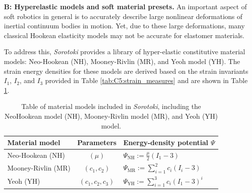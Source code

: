 \textbf{B: Hyperelastic models and soft material presets.} An important aspect of soft robotics in general is to accurately describe large nonlinear deformations of inertial continuum bodies in motion. Yet, due to these large deformations, many classical Hookean elasticity models may not be accurate for elastomer materials. 

To address this, \textit{Sorotoki} provides a library of hyper-elastic constitutive material models: Neo-Hookean (NH), Mooney-Rivlin (MR), and Yeoh model (YH). The strain energy densities for these models are derived based on the strain invariants $I_1$, $I_2$, and $I_3$ provided in Table \ref{tab:C5:strain_measures} and are shown in Table \ref{tab:C5:elasticitymodels}.
%
\begin{table}[t]
    \renewcommand\arraystretch{1.25}
    \setlength{\tabcolsep}{2.25pt}
    \centering
    \caption{Table of material models included in \textit{Sorotoki}, including the NeoHookean model (NH), Mooney-Rivlin model (MR), and Yeoh (YH) model.}
    \label{tab:C5:elasticitymodels}
    \begin{tabular}{lcl}
        \hline
        Material model     & \;\;Parameters\;\; & \quad \;\; Energy-density potential $\Psi$                                     \\
        \hline \hline
        Neo-Hookean (NH)   & $(\mu)$            & \quad \;\; $\Psi_{\textrm{NH}} := \frac{\mu}{2} \left(I_1 - 3 \right)$         \\
        Mooney-Rivlin (MR) & $(c_1,c_2)$        & \quad \;\; $\Psi_{\textrm{MR}} := \sum^{2}_{i=1} c_i \left(I_i - 3 \right)$    \\
        Yeoh (YH)          & $(c_1,c_2,c_3)$    & \quad \;\; $\Psi_{\textrm{YH}}  := \sum^{3}_{i=1} c_i \left(I_1 - 3 \right)^i$ \\
        \hline
    \end{tabular}
\end{table}
%
